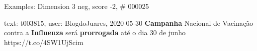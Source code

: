 \begin{frame}{Examples: Dimension 3 neg, score -2, \# 000025}
\footnotesize
\begin{alertblock}{text: t003815, user: BlogdoJuares, 2020-05-30}
\textbf{Campanha} Nacional de Vacinação contra a \textbf{Influenza} será 
\textbf{prorrogada} até o dia 30 de junho https://t.co/4SW1UjScim 
\end{alertblock}
\end{frame}
